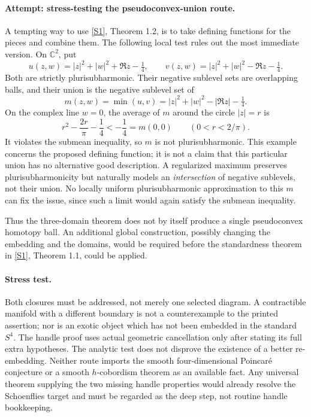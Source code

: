 \documentclass[11pt,a4paper]{article}
\newcommand{\C}{\mathbb{C}}
\newcommand{\sref}[2]{\hyperlink{source:#1:#2}{[S#2]}}
\numberwithin{equation}{section}
\begin{document}
\paragraph{Attempt: stress-testing the pseudoconvex-union route.}
A tempting way to use \sref{statement}{1}, Theorem 1.2, is to take defining
functions for the pieces and combine them. The following local test
rules out the most immediate version. On $\C^2$, put
\begin{equation}
 u(z,w)=|z|^2+|w|^2+\Re z-\tfrac14,\qquad
 v(z,w)=|z|^2+|w|^2-\Re z-\tfrac14.
\end{equation}
Both are strictly plurisubharmonic. Their negative sublevel sets are
overlapping balls, and their union is the negative sublevel set of
\begin{equation}
 m(z,w)=\min(u,v)=|z|^2+|w|^2-|\Re z|-\tfrac14.
\end{equation}
On the complex line $w=0$, the average of $m$ around the circle
$|z|=r$ is
\begin{equation}
 r^2-\frac{2r}{\pi}-\frac14<-\frac14=m(0,0)
 \qquad(0<r<2/\pi).
\end{equation}
It violates the submean inequality, so $m$ is not plurisubharmonic.
This example concerns the proposed defining function; it is not a
claim that this particular union has no alternative good description.
A regularized maximum preserves plurisubharmonicity but naturally
models an \emph{intersection} of negative sublevels, not their union.
No locally uniform plurisubharmonic approximation to this $m$ can fix
the issue, since such a limit would again satisfy the submean inequality.

Thus the three-domain theorem does not by itself produce a single
pseudoconvex homotopy ball. An additional global construction, possibly
changing the embedding and the domains, would be required before the
standardness theorem in \sref{statement}{1}, Theorem 1.1, could be applied.

\paragraph{Stress test.}
Both closures must be addressed, not merely one selected diagram. A
contractible manifold with a different boundary is not a counterexample
to the printed assertion; nor is an exotic object which has not been
embedded in the standard $S^4$. The handle proof uses actual geometric
cancellation only after stating its full extra hypotheses. The analytic
test does not disprove the existence of a better re-embedding. Neither
route imports the smooth four-dimensional Poincar\'e conjecture or a
smooth $h$-cobordism theorem as an available fact. Any universal theorem
supplying the two missing handle properties would already resolve the
Schoenflies target and must be regarded as the deep step, not routine
handle bookkeeping.
\end{document}

